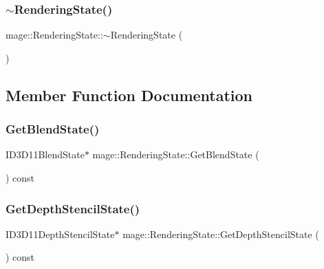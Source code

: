 \subsubsection{\texorpdfstring{$\sim$\+Rendering\+State()}{~RenderingState()}}
{\footnotesize\ttfamily mage\+::\+Rendering\+State\+::$\sim$\+Rendering\+State (\begin{DoxyParamCaption}{ }\end{DoxyParamCaption})\hspace{0.3cm}{\ttfamily [default]}}



\subsection{Member Function Documentation}
\hypertarget{structmage_1_1_rendering_state_a72fec4a686de92afdb32a38907fb8e00}{}\label{structmage_1_1_rendering_state_a72fec4a686de92afdb32a38907fb8e00} 
\subsubsection{\texorpdfstring{Get\+Blend\+State()}{GetBlendState()}}
{\footnotesize\ttfamily I\+D3\+D11\+Blend\+State$\ast$ mage\+::\+Rendering\+State\+::\+Get\+Blend\+State (\begin{DoxyParamCaption}{ }\end{DoxyParamCaption}) const}

\hypertarget{structmage_1_1_rendering_state_aefe2d1e5e2b2f5b3043724eed3c9ea44}{}\label{structmage_1_1_rendering_state_aefe2d1e5e2b2f5b3043724eed3c9ea44} 
\subsubsection{\texorpdfstring{Get\+Depth\+Stencil\+State()}{GetDepthStencilState()}}
{\footnotesize\ttfamily I\+D3\+D11\+Depth\+Stencil\+State$\ast$ mage\+::\+Rendering\+State\+::\+Get\+Depth\+Stencil\+State (\begin{DoxyParamCaption}{ }\end{DoxyParamCaption}) const}

